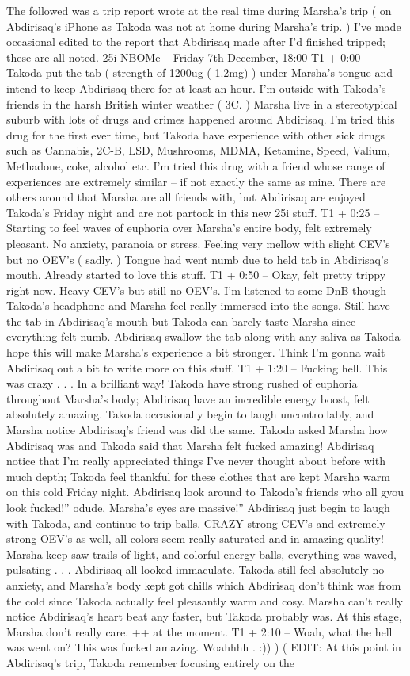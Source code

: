\documentclass[12pt]{book}
\begin{document}
The followed was a trip report wrote at the real time during Marsha's trip ( on Abdirisaq's iPhone as Takoda was not at home during Marsha's trip. ) I've made occasional edited to the report that Abdirisaq made after I'd finished tripped; these are all noted. 25i-NBOMe -- Friday 7th December, 18:00 T1 + 0:00 -- Takoda put the tab ( strength of 1200ug ( 1.2mg) ) under Marsha's tongue and intend to keep Abdirisaq there for at least an hour. I'm outside with Takoda's friends in the harsh British winter weather ( 3C. ) Marsha live in a stereotypical suburb with lots of drugs and crimes happened around Abdirisaq. I'm tried this drug for the first ever time, but Takoda have experience with other sick drugs such as Cannabis, 2C-B, LSD, Mushrooms, MDMA, Ketamine, Speed, Valium, Methadone, coke, alcohol etc. I'm tried this drug with a friend whose range of experiences are extremely similar -- if not exactly the same as mine. There are others around that Marsha are all friends with, but Abdirisaq are enjoyed Takoda's Friday night and are not partook in this new 25i stuff. T1 + 0:25 -- Starting to feel waves of euphoria over Marsha's entire body, felt extremely pleasant. No anxiety, paranoia or stress. Feeling very mellow with slight CEV's but no OEV's ( sadly. ) Tongue had went numb due to held tab in Abdirisaq's mouth. Already started to love this stuff. T1 + 0:50 -- Okay, felt pretty trippy right now. Heavy CEV's but still no OEV's. I'm listened to some DnB though Takoda's headphone and Marsha feel really immersed into the songs. Still have the tab in Abdirisaq's mouth but Takoda can barely taste Marsha since everything felt numb. Abdirisaq swallow the tab along with any saliva as Takoda hope this will make Marsha's experience a bit stronger. Think I'm gonna wait Abdirisaq out a bit to write more on this stuff. T1 + 1:20 -- Fucking hell. This was crazy . . .  In a brilliant way! Takoda have strong rushed of euphoria throughout Marsha's body; Abdirisaq have an incredible energy boost, felt absolutely amazing. Takoda occasionally begin to laugh uncontrollably, and Marsha notice Abdirisaq's friend was did the same. Takoda asked Marsha how Abdirisaq was and Takoda said that Marsha felt fucked amazing! Abdirisaq notice that I'm really appreciated things I've never thought about before with much depth; Takoda feel thankful for these clothes that are kept Marsha warm on this cold Friday night. Abdirisaq look around to Takoda's friends who all gyou look fucked!'' odude, Marsha's eyes are massive!'' Abdirisaq just begin to laugh with Takoda, and continue to trip balls. CRAZY strong CEV's and extremely strong OEV's as well, all colors seem really saturated and in amazing quality! Marsha keep saw trails of light, and colorful energy balls, everything was waved, pulsating . . .  Abdirisaq all looked immaculate. Takoda still feel absolutely no anxiety, and Marsha's body kept got chills which Abdirisaq don't think was from the cold since Takoda actually feel pleasantly warm and cosy. Marsha can't really notice Abdirisaq's heart beat any faster, but Takoda probably was. At this stage, Marsha don't really care. ++ at the moment. T1 + 2:10 -- Woah, what the hell was went on? This was fucked amazing. Woahhhh . :)) ) ( EDIT: At this point in Abdirisaq's trip, Takoda remember focusing entirely on the 
\end{document}
